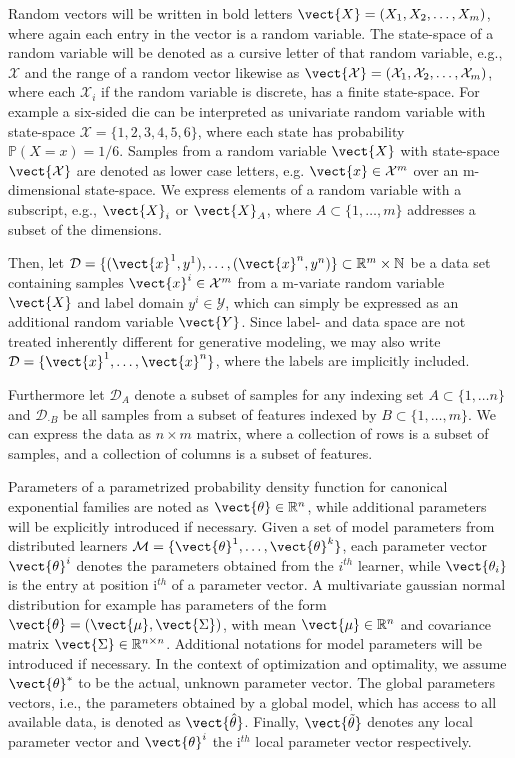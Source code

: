     Random vectors will be written in bold letters $\vect{X} = (X_1, X_2, \ldots, X_m)$, where again each entry in the vector is a random variable.
    The state-space of a random variable will be denoted as a cursive letter of that random variable, e.g., $\mathcal{X}$ and the range of a random vector likewise as $\vect{\mathcal{X}} = (\mathcal{X}_1, \mathcal{X}_2, \ldots, \mathcal{X}_m)$, where each $\mathcal{X}_i$ if the random variable is discrete, has a finite state-space.
    For example a six-sided die can be interpreted as univariate random variable with state-space $\mathcal{X} = \{1,2,3,4,5,6\}$, where each state has probability $\mathbb{P}(X=x) = 1/6$.
    Samples from a random variable $\vect{X}$  with state-space $\vect{\mathcal{X}}$ are denoted as lower case letters, e.g. $\vect{x} \in \mathcal{X}^m$ over an m-dimensional state-space.
    We express elements of a random variable with a  subscript, e.g., $\vect{X}_i$ or $\vect{X}_A$, where $A \subset\{1, \ldots, m\} $ addresses a subset of the dimensions.

    Then, let $\mathcal{D} = \{(\vect{x}^1, y^1), \ldots, (\vect{x}^n, y^n)\} \subset \mathbb{R}^m \times \mathbb{N}$ be a data set containing samples $\vect{x}^i \in \mathcal{X}^m$ from a m-variate random variable $\vect{X}$ and label domain $y^i \in \mathcal{Y}$, which can simply be expressed as an additional random variable $\vect{Y}$.
    Since label- and data space are not treated inherently different for generative modeling, we may also write $\mathcal{D} = \{\vect{x}^1, \ldots, \vect{x}^n\}$, where the labels are implicitly included.

    Furthermore let $\mathcal{D}_A$ denote a subset of samples for any indexing set $A\subset \{1, \ldots n\}$ and $\mathcal{D}_{\cdot B}$ be all samples from a subset of features indexed by $B \subset \{1, \ldots, m\}$.
    We can express the data as $n \times m$ matrix, where a collection of rows is a subset of samples, and a collection of columns is a subset of features.

    Parameters of a parametrized probability density function for canonical exponential families are noted as $\vect{\theta} \in \mathbb{R}^n$, while additional parameters will be explicitly introduced if necessary.
    Given a set of model parameters from distributed learners $\mathcal{M} = \{\vect{\theta}^1,  \ldots, \vect{\theta}^k\}$, each parameter vector $\vect{\theta}^i$ denotes the parameters obtained from the  $i^{th}$ learner, while $\vect{\theta_i}$ is the entry at position i$^{th}$ of a parameter vector.
    A multivariate gaussian normal distribution for example has parameters of the form $\vect{\theta} = (\vect{\mu}, \vect{\Sigma})$, with mean $\vect{\mu} \in \mathbb{R}^{n}$ and covariance matrix $\vect{\Sigma} \in \mathbb{R}^{n \times n}$.
    Additional notations for model parameters will be introduced if necessary.
    In the context of optimization and optimality, we assume $\vect{\theta}^*$ to be the actual, unknown parameter vector.
    The global parameters vectors, i.e., the parameters obtained by a global model, which has access to all available data, is denoted as  $\vect{\hat{\theta}}$.
    Finally, $\vect{\tilde{\theta}}$ denotes any local parameter vector and $\vect{\theta}^{i}$ the i$^{th}$ local parameter vector respectively.

